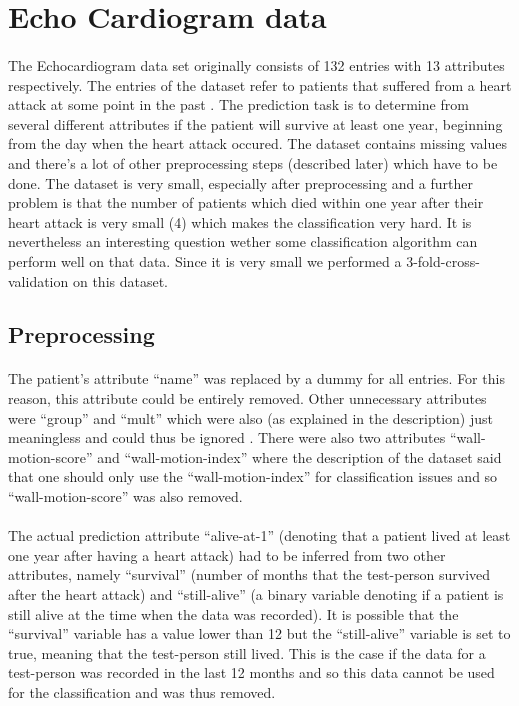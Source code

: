 \documentclass[paper=a4, fontsize=11pt]{scrartcl} %
\numberwithin{equation}{section} %
\numberwithin{figure}{section} %
\numberwithin{table}{section} %
\begin{document}
\section{Echo Cardiogram data}

\paragraph{}The Echocardiogram data set originally consists of 132 entries with 13 attributes respectively. The entries of the dataset refer to patients that suffered from a heart attack at some point in the past \cite{uci-repo}. The prediction task is to determine from several different attributes if the patient will survive at least one year, beginning from the day when the heart attack occured. The dataset contains missing values and there's a lot of other preprocessing steps (described later) which have to be done. The dataset is very small, especially after preprocessing and a further problem is that the number of patients which died within one year after their heart attack is very small (4) which makes the classification very hard. It is nevertheless an interesting question wether some classification algorithm can perform well on that data. Since it is very small we performed a 3-fold-cross-validation on this dataset.


\subsection{Preprocessing}

\paragraph{}The patient's attribute ``name'' was replaced by a dummy for all entries. For this reason, this attribute could be entirely removed. Other unnecessary attributes were ``group'' and ``mult'' which were also (as explained in the description) just meaningless and could thus be ignored \cite{uci-repo}. There were also two attributes ``wall-motion-score'' and ``wall-motion-index'' where the description of the dataset said that one should only use the ``wall-motion-index'' for classification issues and so ``wall-motion-score'' was also removed.

\paragraph{}The actual prediction attribute ``alive-at-1'' (denoting that a patient lived at least one year after having a heart attack) had to be inferred from two other attributes, namely ``survival'' (number of months that the test-person survived after the heart attack) and ``still-alive'' (a binary variable denoting if a patient is still alive at the time when the data was recorded). It is possible that the ``survival'' variable has a value lower than 12 but the ``still-alive'' variable is set to true, meaning that the test-person still lived. This is the case if the data for a test-person was recorded in the last 12 months and so this data cannot be used for the classification and was thus removed.
\end{document}
